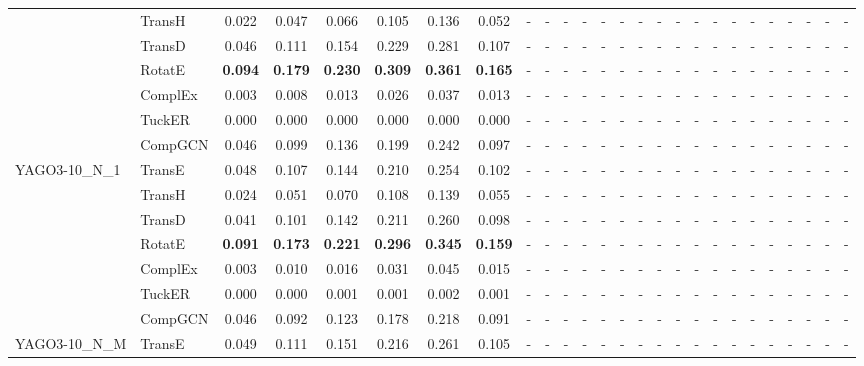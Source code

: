 \begin{table}[p]
{\begin{tabular}{l|l||cccccc||cccccc||cccccc||cccccc}
 & TransH & 0.022 & 0.047 & 0.066 & 0.105 & 0.136 & 0.052 & - & - & - & - & - & - & - & - & - & - & - & - & - & - & - & - & - & - \\
 & TransD & 0.046 & 0.111 & 0.154 & 0.229 & 0.281 & 0.107 & - & - & - & - & - & - & - & - & - & - & - & - & - & - & - & - & - & - \\
 & RotatE & \textbf{0.094} & \textbf{0.179} & \textbf{0.230} & \textbf{0.309} & \textbf{0.361} & \textbf{0.165} & - & - & - & - & - & - & - & - & - & - & - & - & - & - & - & - & - & - \\
 & ComplEx & 0.003 & 0.008 & 0.013 & 0.026 & 0.037 & 0.013 & - & - & - & - & - & - & - & - & - & - & - & - & - & - & - & - & - & - \\
 & TuckER & 0.000 & 0.000 & 0.000 & 0.000 & 0.000 & 0.000 & - & - & - & - & - & - & - & - & - & - & - & - & - & - & - & - & - & - \\
 & CompGCN & 0.046 & 0.099 & 0.136 & 0.199 & 0.242 & 0.097 & - & - & - & - & - & - & - & - & - & - & - & - & - & - & - & - & - & - \\
\hline
\multirow{7}{*}{YAGO3-10\_N\_1} & TransE & 0.048 & 0.107 & 0.144 & 0.210 & 0.254 & 0.102 & - & - & - & - & - & - & - & - & - & - & - & - & - & - & - & - & - & - \\
 & TransH & 0.024 & 0.051 & 0.070 & 0.108 & 0.139 & 0.055 & - & - & - & - & - & - & - & - & - & - & - & - & - & - & - & - & - & - \\
 & TransD & 0.041 & 0.101 & 0.142 & 0.211 & 0.260 & 0.098 & - & - & - & - & - & - & - & - & - & - & - & - & - & - & - & - & - & - \\
 & RotatE & \textbf{0.091} & \textbf{0.173} & \textbf{0.221} & \textbf{0.296} & \textbf{0.345} & \textbf{0.159} & - & - & - & - & - & - & - & - & - & - & - & - & - & - & - & - & - & - \\
 & ComplEx & 0.003 & 0.010 & 0.016 & 0.031 & 0.045 & 0.015 & - & - & - & - & - & - & - & - & - & - & - & - & - & - & - & - & - & - \\
 & TuckER & 0.000 & 0.000 & 0.001 & 0.001 & 0.002 & 0.001 & - & - & - & - & - & - & - & - & - & - & - & - & - & - & - & - & - & - \\
 & CompGCN & 0.046 & 0.092 & 0.123 & 0.178 & 0.218 & 0.091 & - & - & - & - & - & - & - & - & - & - & - & - & - & - & - & - & - & - \\
\hline
\multirow{7}{*}{YAGO3-10\_N\_M} & TransE & 0.049 & 0.111 & 0.151 & 0.216 & 0.261 & 0.105 & - & - & - & - & - & - & - & - & - & - & - & - & - & - & - & - & - & - \\

\end{tabular}}
\end{table}
